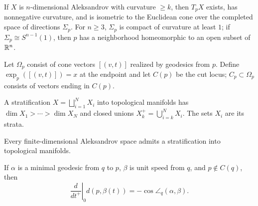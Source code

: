 \begin{theorem}
\label{thm:chow-iii-g49-tangent-cone}

If $X$ is $n$-dimensional Aleksandrov with curvature $\geq k$, then $T_pX$
exists, has nonnegative curvature, and is isometric to the Euclidean cone over
the completed space of directions $\Sigma_p$.  For $n\geq3$, $\Sigma_p$ is
compact of curvature at least $1$; if $\Sigma_p\cong S^{n-1}(1)$, then $p$ has
a neighborhood homeomorphic to an open subset of $\mathbb R^n$.
\end{theorem}

\begin{definition}
\label{def:chow-iii-g50-exponential-cut-locus}

Let $\Omega_p$ consist of cone vectors $[(v,t)]$ realized by geodesics from
$p$.  Define $\exp_p([(v,t)])=x$ at the endpoint and let $C(p)$ be the cut
locus; $C_p\subset\Omega_p$ consists of vectors ending in $C(p)$.
\end{definition}

\begin{definition}[Stratification]
\label{def:chow-iii-g51-stratification}
A stratification $X=\bigsqcup_{i=1}^N X_i$ into topological manifolds has
$\dim X_1>\cdots>\dim X_N$ and closed unions
$X_k^+=\bigcup_{i=k}^N X_i$.  The sets $X_i$ are its strata.
\end{definition}

\begin{theorem}
\label{thm:chow-iii-g52-aleksandrov-stratification}

Every finite-dimensional Aleksandrov space admits a stratification into
topological manifolds.
\end{theorem}

\begin{lemma}
\label{lem:chow-iii-g53-distance-derivative}

If $\alpha$ is a minimal geodesic from $q$ to $p$, $\beta$ is unit speed from
$q$, and $p\notin C(q)$, then
\[
\left.\frac{d}{dt^+}\right|_{0}d(p,\beta(t))=-\cos\angle_q(\alpha,\beta).
\]
\end{lemma}

